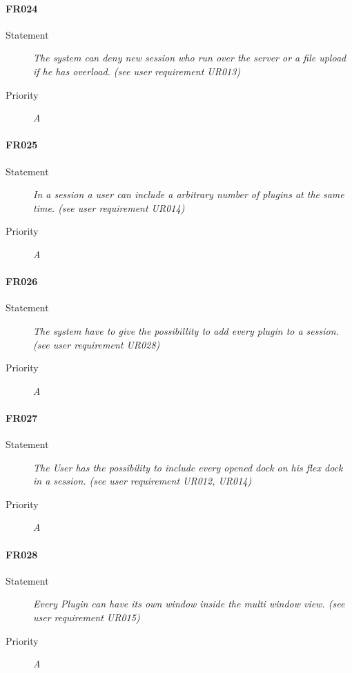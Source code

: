 \paragraph{FR024}
\begin{description}
  \item [Statement] 
    \textit{The system can deny new session who run over the server or
      a file upload if he has overload.
    (see user requirement UR013)}
  \item [Priority] \textit{A}
\end{description}

\paragraph{FR025}
\begin{description}
  \item [Statement] 
    \textit{In a session a user can include a arbitrary number of plugins at the same time. 
    (see user requirement UR014)}
  \item [Priority] \textit{A}
\end{description}

\paragraph{FR026}
\begin{description}
  \item [Statement] 
    \textit{The system have to give the possibillity to add every plugin to a session.
    (see user requirement UR028)}
  \item [Priority] \textit{A}
\end{description}

\paragraph{FR027}
\begin{description}
  \item [Statement] 
    \textit{The User has the possibility to include every opened dock on his flex dock in a session.
    (see user requirement UR012, UR014)}
  \item [Priority] \textit{A}
\end{description}

\paragraph{FR028}
\begin{description}
  \item [Statement] 
    \textit{Every Plugin can have its own window inside the multi window view.
    (see user requirement UR015)}
  \item [Priority] \textit{A}
\end{description}

